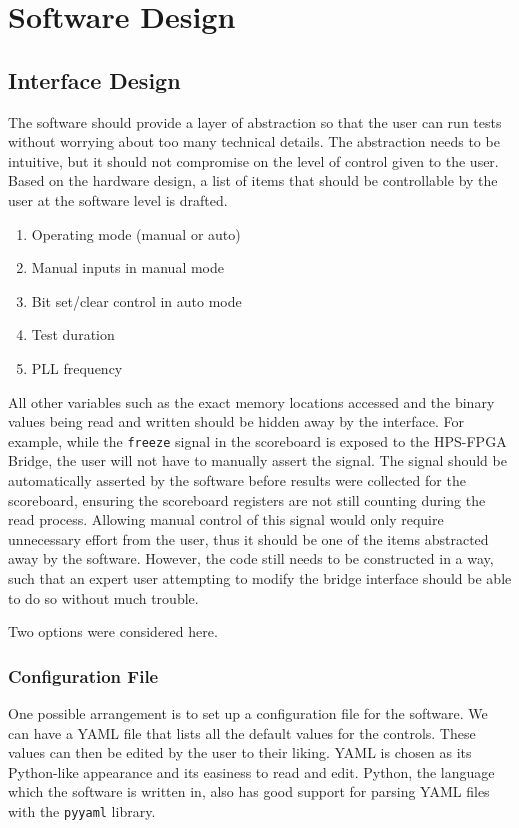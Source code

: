 \chapter{Software Design}

\section{Interface Design}
The software should provide a layer of abstraction so that the user can run tests without worrying about too many technical details.
The abstraction needs to be intuitive, but it should not compromise on the level of control given to the user.
Based on the hardware design, a list of items that should be controllable by the user at the software level is drafted.

\begin{enumerate}
  \setlength\itemsep{0pt}
  \item Operating mode (manual or auto)
  \item Manual inputs in manual mode
  \item Bit set/clear control in auto mode
  \item Test duration
  \item PLL frequency
\end{enumerate}

All other variables such as the exact memory locations accessed and the binary values being read and written should be hidden away by the interface.
For example, while the \texttt{freeze} signal in the scoreboard is exposed to the HPS-FPGA Bridge, the user will not have to manually assert the signal.
The signal should be automatically asserted by the software before results were collected for the scoreboard, ensuring the scoreboard registers are not still counting during the read process.
Allowing manual control of this signal would only require unnecessary effort from the user, thus it should be one of the items abstracted away by the software.
However, the code still needs to be constructed in a way, such that an expert user attempting to modify the bridge interface should be able to do so without much trouble.

Two options were considered here.

\subsection{Configuration File}
One possible arrangement is to set up a configuration file for the software.
We can have a YAML file that lists all the default values for the controls.
These values can then be edited by the user to their liking.
YAML is chosen as its Python-like appearance and its easiness to read and edit.
Python, the language which the software is written in, also has good support for parsing YAML files with the \texttt{pyyaml} library.

